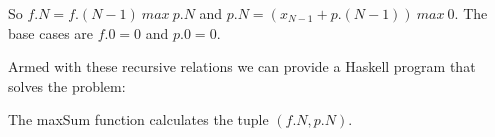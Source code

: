 So $f.N = f.(N - 1)\ max\ p.N$ and $p.N = (x_{N - 1} + p.(N - 1))\ max\ 0$. The base cases are $f.0 = 0$ and $p.0 = 0$.

Armed with these recursive relations we can provide a Haskell program that solves the problem:



The maxSum function calculates the tuple $(f.N, p.N)$.







